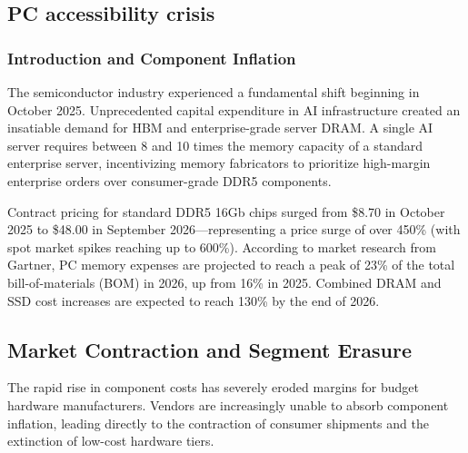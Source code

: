 \documentclass[11pt,a4paper]{article}
\begin{document}
	\subsection{\Large PC accessibility crisis}

	\begin{abstract}
	Since late 2025, the global technology sector has faced an acute memory crisis
	characterized by explosive price inflation in Dynamic Random Access Memory
	(DRAM). Driven by enterprise demand for High-Bandwidth Memory (HBM) and server
	DRAM in Artificial Intelligence (AI) data centers, major manufacturers have
	reallocated manufacturing capacity away from consumer hardware. This paper
	synthesizes market statistics from Gartner, GSMA, and ITU to analyze the
	structural mechanics of component cost inflation, its impact on entry-level PC
	and smartphone markets, and the resulting widening of the global digital
	divide.
	\end{abstract}

	\subsubsection{Introduction and Component Inflation}
	The semiconductor industry experienced a fundamental shift beginning in
	October 2025. Unprecedented capital expenditure in AI infrastructure created an
	insatiable demand for HBM and enterprise-grade server DRAM. A single AI server
	requires between 8 and 10 times the memory capacity of a standard enterprise
	server, incentivizing memory fabricators to prioritize high-margin enterprise
	orders over consumer-grade DDR5 components.

	Contract pricing for standard DDR5 16Gb chips surged from \$8.70 in October
	2025 to \$48.00 in September 2026---representing a price surge of over 450\%
	(with spot market spikes reaching up to 600\%). According to market research
	from Gartner, PC memory expenses are projected to reach a peak of 23\% of the
	total bill-of-materials (BOM) in 2026, up from 16\% in 2025. Combined DRAM and
	SSD cost increases are expected to reach 130\% by the end of 2026.

	\subsection{Market Contraction and Segment Erasure}
	The rapid rise in component costs has severely eroded margins for budget
	hardware manufacturers. Vendors are increasingly unable to absorb component
	inflation, leading directly to the contraction of consumer shipments and the
	extinction of low-cost hardware tiers.
\end{document}
